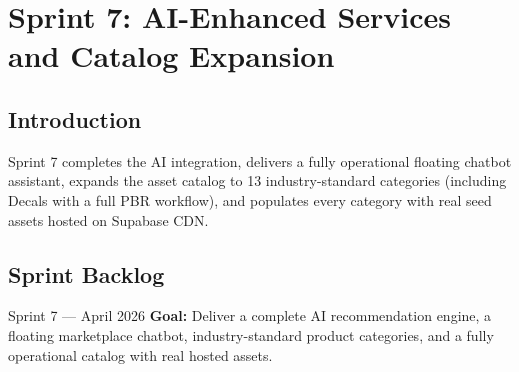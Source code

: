 \section{Sprint 7: AI-Enhanced Services and Catalog Expansion}

\subsection*{Introduction}
Sprint 7 completes the AI integration, delivers a fully operational floating chatbot assistant, expands the asset catalog to 13 industry-standard categories (including Decals with a full PBR workflow), and populates every category with real seed assets hosted on Supabase CDN.

\subsection{Sprint Backlog}

\begin{sprintbox}{Sprint 7 --- April 2026}
\textbf{Goal:} Deliver a complete AI recommendation engine, a floating marketplace chatbot, industry-standard product categories, and a fully operational catalog with real hosted assets.
\end{sprintbox}

\vspace{0.4cm}

